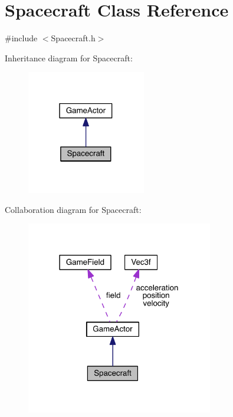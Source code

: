 \hypertarget{class_spacecraft}{\section{Spacecraft Class Reference}
\label{class_spacecraft}
}


{\ttfamily \#include $<$Spacecraft.\+h$>$}



Inheritance diagram for Spacecraft\+:\nopagebreak
\begin{figure}[H]
\begin{center}
\leavevmode
\includegraphics[width=147pt]{class_spacecraft__inherit__graph}
\end{center}
\end{figure}


Collaboration diagram for Spacecraft\+:\nopagebreak
\begin{figure}[H]
\begin{center}
\leavevmode
\includegraphics[width=231pt]{class_spacecraft__coll__graph}
\end{center}
\end{figure}
